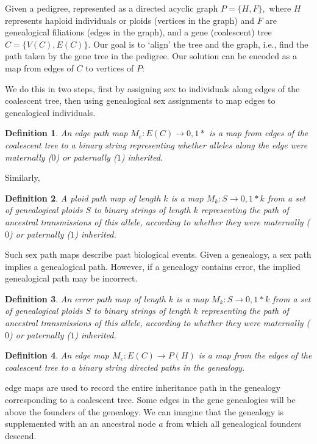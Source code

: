 \documentclass[14pt]{extarticle}
\newtheorem{definition}{Definition}
\begin{document}
Given a pedigree, represented as a directed acyclic graph $P = \{H, F\},$ where $H$ represents haploid individuals or ploids (vertices in the graph) and $F$ are genealogical filiations (edges in the graph), and a gene (coalescent) tree $C = \{V(C), E(C)\}.$ Our goal is to `align' the tree and the graph, i.e., find the path taken by the gene tree in the pedigree. Our solution can be encoded as a map from edges of $C$ to vertices of $P$:

We do this in two steps, first by assigning sex to individuals along edges of the coalescent tree, then using genealogical sex assignments to map edges to genealogical individuals.  

\begin{definition}
An edge path map $M_e:E(C) \rightarrow {0,1}*$ is a map from edges of the coalescent tree to a binary string representing whether alleles along the edge were maternally ($0$) or paternally ($1$) inherited.     
\end{definition}

Similarly, 
\begin{definition}
A ploid path map of length $k$ is a map $M_k:S \rightarrow {0,1}*k$ from a set of genealogical ploids $S$ to binary strings of length $k$ representing the path of ancestral transmissions of this allele, according to whether they were maternally ($0$) or paternally ($1$) inherited.      
\end{definition}

Such sex path maps describe past biological events. Given a genealogy, a sex path implies a genealogical path. However, if a genealogy contains error, the implied genealogical path may be incorrect. 

\begin{definition}
An error path map of length $k$ is a map $M_k:S \rightarrow {0,1}*k$ from a set of genealogical ploids $S$ to binary strings of length $k$ representing the path of ancestral transmissions of this allele, according to whether they were maternally ($0$) or paternally ($1$) inherited.      
\end{definition}


\begin{definition}
An edge map $M_e:E(C) \rightarrow P(H)$ is a map from the edges of the coalescent tree to a binary string directed paths in the genealogy.    
\end{definition}

edge maps are used to record the entire inheritance path in the genealogy corresponding to a coalescent tree. Some edges in the gene genealogies will be above the founders of the genealogy. We can imagine that the genealogy is supplemented with an an ancestral node $a$ from which all genealogical founders descend.  
\end{document}
